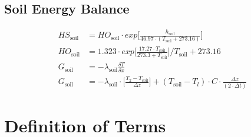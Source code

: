 \documentclass[10pt]{article}
\begin{document}
\subsection*{Soil Energy Balance}
\begin{align}
 HS_{\text{soil}} &= HO_{\text{soil}} \cdot exp\biggl[\frac{h_{\text{soil}}}{46.97 \cdot (T_\text{soil} + 273.16)}\biggr] \label{eqn:HSsoil} \\
 HO_{\text{soil}} &= 1.323 \cdot exp\biggl[\frac{17.27 \cdot T_\text{soil}}{273.3 + T_\text{soil}}\biggr]\Bigg/ T_\text{soil} + 273.16 \label{eqn:HOsoil} \\
 G_{\text{soil}} &= -\lambda_{\text{soil}} \frac{\delta T}{\delta x} \label{eqn:Gsoil} \\
 G_{\text{soil}} &= -\lambda_{\text{soil}} \cdot \biggl[\frac{T_2 - T_\text{soil}}{\Delta z}\biggr] + (T_\text{soil} - T_l) \cdot C \cdot \frac{\Delta z}{(2 \cdot \Delta t)} \label{eqn:Gsoil2} 
\end{align}

\newpage

\section*{Definition of Terms } 
\end{document}
